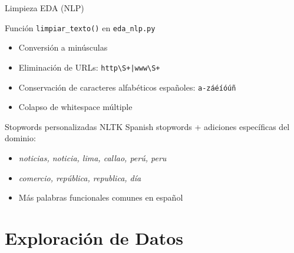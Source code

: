 \documentclass[11pt,aspectratio=169,spanish]{beamer}
\begin{document}
\begin{frame}[fragile]{Limpieza EDA (NLP)}
    \begin{block}{Función \texttt{limpiar\_texto()} en \texttt{eda\_nlp.py}}
        \begin{itemize}
            \item Conversión a minúsculas
            \item Eliminación de URLs: \texttt{http\textbackslash S+|www\textbackslash S+}
            \item Conservación de caracteres alfabéticos españoles: \texttt{a-záéíóúñ}
            \item Colapso de whitespace múltiple
        \end{itemize}
    \end{block}

    \vspace{0.3cm}
    \begin{block}{Stopwords personalizadas}
        NLTK Spanish stopwords + adiciones específicas del dominio:
        \begin{itemize}
            \item \textit{noticias, noticia, lima, callao, perú, peru}
            \item \textit{comercio, república, republica, día}
            \item Más palabras funcionales comunes en español
        \end{itemize}
    \end{block}
\end{frame}

\section{Exploración de Datos}
\end{document}
